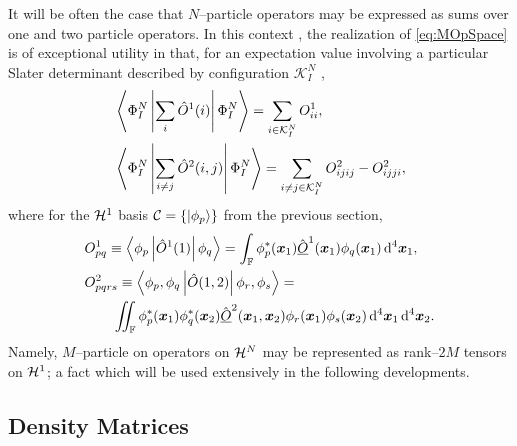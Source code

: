 It will be often the case that $N$--particle operators may be expressed as sums over one and
two particle operators. In this context , the realization of \cref{eq:MOpSpace} is of exceptional utility in that,
for an expectation value involving a particular Slater determinant described by configuration $\mathcal{K}_I^N$
\cite{Ostlund12_book},
\begin{subequations}
  \label{eq:SlaterCondon}
\begin{align}
  &\left\langle \Phi^N_I \left\vert \sum_i\hat{O}^1(i) \right\vert \Phi^N_I \right\rangle = \sum_{i\in\mathcal{K}^N_I} O^1_{ii},\\
  &\left\langle \Phi^N_I \left\vert \sum_{i\neq j} \hat{O}^2(i,j) \right\vert \Phi^N_I \right\rangle = 
    \sum_{i\neq j \in\mathcal{K}^N_I} O^2_{ijij} - O^2_{ijji},
\end{align}
\end{subequations}
where for the $\mathcal{H}^1$ basis $\mathcal{C} = \left \lbrace \left\vert \phi_p \right\rangle \right\rbrace$ from the previous section,
\begin{subequations}
  \label{eq:DiracInts}
\begin{align}
  &O^1_{pq} \equiv \left\langle \phi_p \left\vert \hat{O}^1(1) \right\vert \phi_q \right\rangle = 
    \int_{\mathbb F} \phi_p^*(\boldsymbol{x}_1) \hat{\underline{O}}^1(\boldsymbol{x}_1) \phi_q(\boldsymbol{x}_1) \,\mathrm{d}^4 \boldsymbol{x}_1,\\
  &O^2_{pqrs} \equiv \left\langle \phi_p, \phi_q  \left\vert \hat{O}(1,2) \right\vert \phi_r, \phi_s \right\rangle = \nonumber \\ &\qquad
    \int\mkern-12mu\int_{\mathbb F} 
      \phi_p^*(\boldsymbol{x}_1) \phi_q^*(\boldsymbol{x}_2) \hat{\underline{O}}^2(\boldsymbol{x}_1,\boldsymbol{x}_2) 
      \phi_r(\boldsymbol{x}_1) \phi_s(\boldsymbol{x}_2) \,\mathrm{d}^4 \boldsymbol{x}_1 \,\mathrm{d}^4 \boldsymbol{x}_2.
\end{align}
\end{subequations}
Namely, $M$--particle on operators on $\mathcal{H}^N$ may be represented as rank--$2M$ tensors on $\mathcal{H}^1$; a fact which will
be used extensively in the following developments.


\subsection{Density Matrices}
\label{sec:DenMat}


